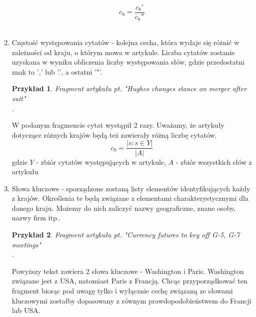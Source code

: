 \documentclass{classrep}
\newtheorem{exmp}{Przykład}[section]
\begin{document}
\begin{enumerate}
    \begin{equation}
        c_8 = \frac{c_8'}{c_8''}
    \end{equation} \\
    \item Częstość występowania cytatów - 
     kolejna cecha, która wydaje się różnić w zależności od kraju, o którym mowa w artykule. Liczba cytatów zostanie uzyskana w wyniku obliczenia liczby występowania słów, gdzie przedostatni znak to ',' lub '.', a ostatni '"'. \\
    \begin{exmp}Fragment artykułu pt. "Hughes changes stance on merger after suit" \cite{reuters} \\
    . \\
    \end{exmp}
    W podanym fragmencie cytat wystąpił 2 razy. Uważamy, że artykuły dotyczące różnych krajów będą też zawierały różną liczbę cytatów.
    \begin{equation}
        c_9 = \frac{|{s: s \in Y}|}{|A|}
    \end{equation}
    gdzie $Y$ - zbiór cytatów występujących w artykule, $A$ - zbiór wszystkich słów z artykułu
    \item Słowa kluczowe - sporządzone zostaną listy elementów identyfikujących każdy z krajów. Określenia te będą związane z elementami charakterystycznymi dla danego kraju. Możemy do nich zaliczyć nazwy geograficzne, znane osoby, nazwy firm itp..  \\
    \begin{exmp}Fragment artykułu pt. "Currency futures to key off G-5, G-7 meetings" \cite{reuters} \\
    . \\
    \end{exmp}
    Powyższy tekst zawiera 2 słowa kluczowe - Washington i Paris. Washington związane jest z USA, natomiast Paris z Francją. Chcąc przyporządkować ten fragment biorąc pod uwagę tylko i wyłącznie cechę związaną ze słowami kluczowymi zostałby dopasowany z równym prawdopodobieństwem do Francji lub USA. 

\end{enumerate}
\end{document}
